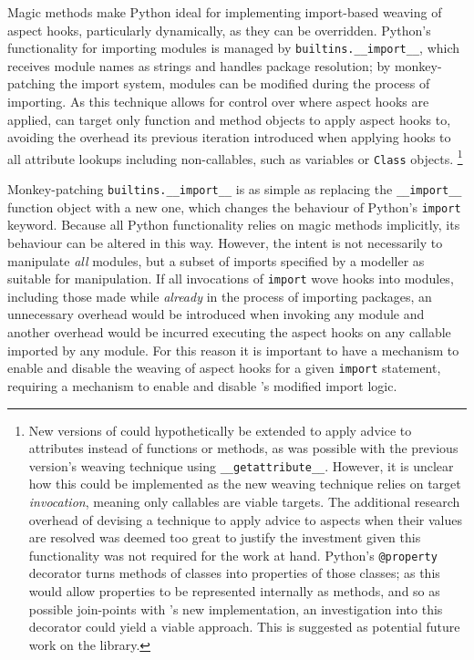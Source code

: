 Magic methods make Python ideal for implementing import-based weaving of aspect
hooks, particularly dynamically, as they can be overridden. Python's
functionality for importing modules is managed by
\lstinline{builtins.__import__}, which receives module names as strings and
handles package resolution; by monkey-patching the import system, modules can be
modified during the process of importing. As this technique allows for control
over where aspect hooks are applied, \pdsf can target only function and method
objects to apply aspect hooks to, avoiding the overhead its previous iteration
introduced when applying hooks to all attribute lookups including non-callables,
such as variables or \lstinline{Class} objects. \footnote{New versions of
\pdsf{} could hypothetically be extended to apply advice to attributes instead
of functions or methods, as was possible with the previous version's weaving
technique using \lstinline{__getattribute__}. However, it is unclear how this
could be implemented as the new weaving technique relies on target
\emph{invocation}, meaning only callables are viable targets. The additional
research overhead of devising a technique to apply advice to aspects when their
values are resolved was deemed too great to justify the investment given this
functionality was not required for the work at hand. Python's
\lstinline{@property} decorator turns methods of classes into properties of
those classes; as this would allow properties to be represented internally as
methods, and so as possible join-points with \pdsf{}'s new implementation, an
investigation into this decorator could yield a viable approach. This is
suggested as potential future work on the \pdsf{} library.}

Monkey-patching \lstinline{builtins.__import__} is as simple as replacing the
\lstinline{__import__} function object with a new one, which changes the
behaviour of Python's \lstinline{import} keyword. Because all Python
functionality relies on magic methods implicitly, its behaviour can be altered
in this way. However, the intent is not necessarily to manipulate \emph{all}
modules, but a subset of imports specified by a modeller as suitable for
manipulation. If all invocations of \lstinline{import} wove hooks into modules,
including those made while \emph{already} in the process of importing packages,
an unnecessary overhead would be introduced when invoking any module and another
overhead would be incurred executing the aspect hooks on any callable imported
by any module. For this reason it is important to have a mechanism to enable and
disable the weaving of aspect hooks for a given \lstinline{import} statement,
requiring a mechanism to enable and disable \pdsf{}'s modified import logic.

